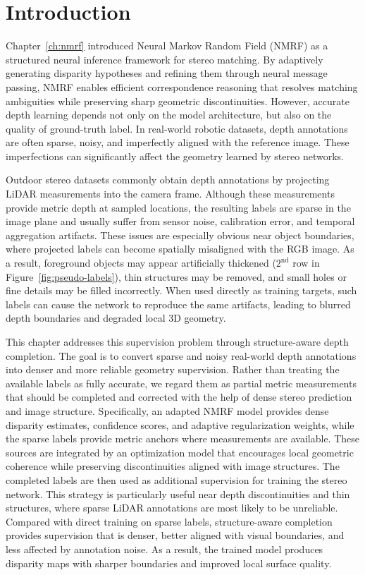 \section{Introduction}

Chapter~\ref{ch:nmrf} introduced Neural Markov Random Field (NMRF) as a structured neural inference framework for stereo matching.
By adaptively generating disparity hypotheses and refining them through neural message passing, NMRF enables efficient correspondence reasoning that resolves matching ambiguities while preserving sharp geometric discontinuities.
However, accurate depth learning depends not only on the model architecture, but also on the quality of ground-truth label.
In real-world robotic datasets, depth annotations are often sparse, noisy, and imperfectly aligned with the reference image.
These imperfections can significantly affect the geometry learned by stereo networks.

Outdoor stereo datasets commonly obtain depth annotations by projecting LiDAR measurements into the camera frame.
Although these measurements provide metric depth at sampled locations, the resulting labels are sparse in the image plane and usually suffer from sensor noise, calibration error, and temporal aggregation artifacts.
These issues are especially obvious near object boundaries, where projected labels can become spatially misaligned with the RGB image.
As a result, foreground objects may appear artificially thickened ($2^\mathrm{nd}$ row in Figure~\ref{fig:pseudo-labels}), thin structures may be removed, and small holes or fine details may be filled incorrectly.
When used directly as training targets, such labels can cause the network to reproduce the same artifacts, leading to blurred depth boundaries and degraded local 3D geometry.

This chapter addresses this supervision problem through structure-aware depth completion.
The goal is to convert sparse and noisy real-world depth annotations into denser and more reliable geometry supervision.
Rather than treating the available labels as fully accurate, we regard them as partial metric measurements that should be completed and corrected with the help of dense stereo prediction and image structure.
Specifically, an adapted NMRF model provides dense disparity estimates, confidence scores, and adaptive regularization weights, while the sparse labels provide metric anchors where measurements are available.
These sources are integrated by an optimization model that encourages local geometric coherence while preserving discontinuities aligned with image structures.
The completed labels are then used as additional supervision for training the stereo network.
This strategy is particularly useful near depth discontinuities and thin structures, where sparse LiDAR annotations are most likely to be unreliable.
Compared with direct training on sparse labels, structure-aware completion provides supervision that is denser, better aligned with visual boundaries, and less affected by annotation noise.
As a result, the trained model produces disparity maps with sharper boundaries and improved local surface quality.

